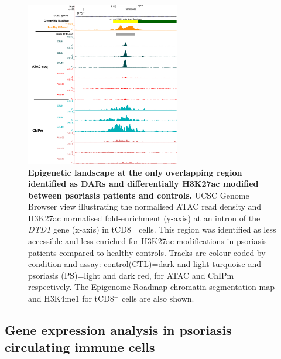 
\begin{figure}[htbp]
\centering
\includegraphics[width=0.6\textwidth]{./Results2/pdfs/ChIPm_H3K27ac_UCSC_CD8_DTD1_track}
\caption[Epigenetic landscape at the only overlapping region identified as differentially accessible and differentially H3K27ac modified between psoriasis patients and controls.]{\textbf{Epigenetic landscape at the only overlapping region identified as DARs and differentially H3K27ac modified between psoriasis patients and controls.} UCSC Genome Browser view illustrating the normalised ATAC read density and H3K27ac normalised fold-enrichment (y-axis) at an intron of the \textit{DTD1} gene (x-axis) in tCD8$^+$ cells. This region was identified as less accessible and less enriched for H3K27ac modifications in psoriasis patients compared to healthy controls. Tracks are colour-coded by condition and assay: control(CTL)=dark and light turquoise and psoriasis (PS)=light and dark red, for ATAC and ChIPm respectively. The Epigenome Roadmap chromatin segmentation map and H3K4me1 for tCD8$^+$ cells are also shown.}
\label{figure:ATAC_ChIPm_overlap_DTD1_region_track}
\end{figure}




\subsection{Gene expression analysis in psoriasis circulating immune cells}



